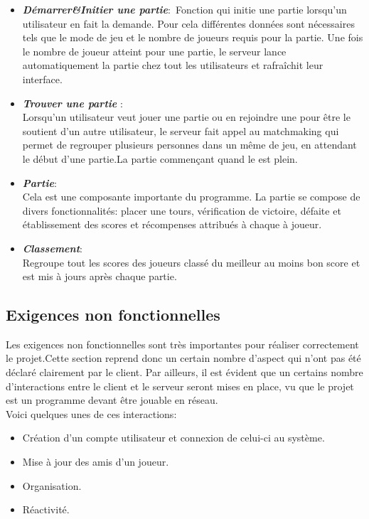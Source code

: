 \documentclass[12pt,a4paper]{article}
\begin{document}
\begin{itemize}
    \item \textit{\textbf{Démarrer\&Initier une partie}}:\
    Fonction qui initie une partie  lorsqu'un \gls{utilisateur} en fait la demande. Pour cela différentes données sont nécessaires tels que le mode de jeu et le nombre de \glspl{joueur} requis pour la partie. Une fois le nombre de joueur atteint pour une partie, le serveur lance automatiquement la partie chez tout les \glspl{utilisateur} et rafraîchit leur interface.
    \item \textit{\textbf{Trouver une partie \index{partie}}}:\\ Lorsqu'un \gls{utilisateur} veut jouer une partie ou en rejoindre une pour être le soutient d'un autre \gls{utilisateur}, le serveur fait appel au matchmaking qui permet de regrouper plusieurs personnes dans un même \index{salon} de jeu, en attendant le début d'une partie.La partie commençant quand le \index{salon} est plein.
    \item \textit{\textbf{Partie}}:\\
    Cela est une composante importante du programme. La partie  se compose de divers fonctionnalités: placer une tours, vérification de victoire, défaite et établissement des scores et récompenses attribués à chaque à \gls{joueur}.
    \item \textit{\textbf{Classement}}:\\
    Regroupe tout les scores des joueurs classé du meilleur au moins bon score et est mis à jours après chaque partie.
\end{itemize}

\subsection{Exigences non fonctionnelles}
Les exigences non fonctionnelles sont très importantes pour réaliser correctement le projet.Cette section reprend donc un certain nombre d'aspect qui n'ont pas été déclaré clairement par le client.
Par ailleurs, il est évident que un certains nombre d’interactions entre le \gls{client}\index{client} et le \gls{serveur}\index{serveur} seront mises en place, vu que le projet est un programme devant être jouable en réseau.\\Voici quelques unes de ces interactions:


\begin{itemize}
    \item Création d'un \gls{compte} \gls{utilisateur} et connexion de celui-ci au système.
    \item Mise à jour des amis d'un joueur. 
    \item Organisation.
    \item Réactivité.
\end{itemize}
\end{document}
